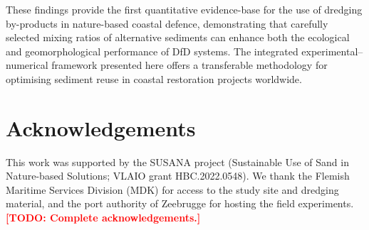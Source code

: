 \documentclass[authoryear,preprint,review,12pt]{elsarticle}
\newcommand{\todo}[1]{\textcolor{red}{\textbf{[TODO: #1]}}}
\begin{document}
These findings provide the first quantitative evidence-base for the use of dredging by-products in nature-based coastal defence, demonstrating that carefully selected mixing ratios of alternative sediments can enhance both the ecological and geomorphological performance of DfD systems. The integrated experimental--numerical framework presented here offers a transferable methodology for optimising sediment reuse in coastal restoration projects worldwide.


\section*{Acknowledgements}

This work was supported by the SUSANA project (Sustainable Use of Sand in Nature-based Solutions; VLAIO grant HBC.2022.0548). We thank the Flemish Maritime Services Division (MDK) for access to the study site and dredging material, and the port authority of Zeebrugge for hosting the field experiments. \todo{Complete acknowledgements.}



\nocite{davidson2005wind, devries2014aeolian, fecan1999parametrization, greeley1985wind}





\end{document}
